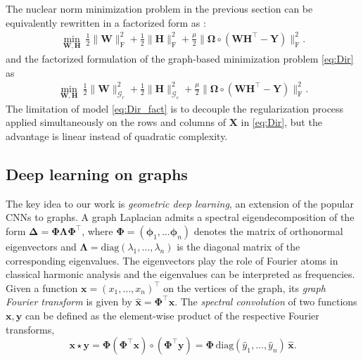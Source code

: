 \documentclass{article}
\begin{document}
The nuclear norm minimization problem in the previous section can be equivalently rewritten in a factorized form as \cite{art:SrebroRennieJaakkola04MatFact}:
 \begin{eqnarray}
\min_{\mathbf{W},\mathbf{H}} \ \frac{1}{2} \| \mathbf{W} \|_\mathrm{F}^2 + \frac{1}{2} \| \mathbf{H} \|_\mathrm{F}^2 + \frac{\mu}{2} \| \boldsymbol{\Omega} \circ (\mathbf{W}\mathbf{H}^\top - \mathbf{Y}) \|_\mathrm{F}^2.
\label{eq:candes_fact}
\end{eqnarray}
and the factorized formulation of the graph-based minimization problem \eqref{eq:Dir} as 
 \begin{eqnarray}
\min_{\mathbf{W},\mathbf{H}}  \ \frac{1}{2} \| \mathbf{W} \|_{\mathcal{G}_{r}}^2 + \frac{1}{2} \| \mathbf{H} \|_{\mathcal{G}_{c}}^2 + \frac{\mu}{2} \| \boldsymbol{\Omega} \circ (\mathbf{W}\mathbf{H}^\top - \mathbf{Y}) \|_\mathrm{F}^2.
\label{eq:Dir_fact}
\end{eqnarray}
The limitation of model \eqref{eq:Dir_fact} is to decouple the regularization process applied simultaneously on the rows and columns of $\mathbf{X}$ in \eqref{eq:Dir}, but the advantage is linear instead of quadratic complexity. 













 




\subsection{Deep learning on graphs}
The key idea to our work is {\em geometric deep learning}, an extension of the popular CNNs to graphs. 
A graph Laplacian admits a spectral eigendecomposition of the form 
$
\boldsymbol{\Delta} = \boldsymbol{\Phi} \boldsymbol{\Lambda} \boldsymbol{\Phi}^\top
$, 
where $\boldsymbol{\Phi} = (\boldsymbol{\phi}_1, \hdots \boldsymbol{\phi}_n)$ denotes the matrix of orthonormal eigenvectors and $\boldsymbol{\Lambda} = \mathrm{diag}(\lambda_1, \hdots, \lambda_n)$ is the diagonal matrix of the corresponding eigenvalues. The eigenvectors play the role of Fourier atoms in classical harmonic analysis and the eigenvalues can be interpreted as frequencies. 
Given a function $\mathbf{x} = (x_1, \hdots, x_n)^\top$ on the vertices of the graph, its {\em graph Fourier transform} is given by $\hat{\mathbf{x}} = \boldsymbol{\Phi}^\top\mathbf{x}$. 
The {\em spectral convolution} of two functions $\mathbf{x}, \mathbf{y}$ can be defined as the element-wise product of the respective  Fourier transforms,
\begin{equation} 
\label{spectral_conv}
\mathbf{x} \star \mathbf{y} = \boldsymbol{\Phi}(\boldsymbol{\Phi}^\top\mathbf{x}) \circ (\boldsymbol{\Phi}^\top\mathbf{y}) = \boldsymbol{\Phi}\, \mathrm{diag}(\hat{y}_1, \hdots, \hat{y}_n)\,\hat{\mathbf{x}}. 
\end{equation}
\end{document}
